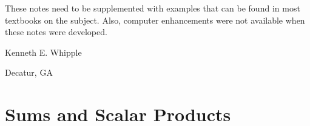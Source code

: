 \documentclass{article}
\begin{document}
These notes need to be supplemented with examples that can be found in most textbooks on the subject. Also, computer enhancements were not available when these notes were developed.

\begin{flushright}
Kenneth E. Whipple

Decatur, GA
\end{flushright}

\newpage


\section{Sums and Scalar Products}

\end{document}
